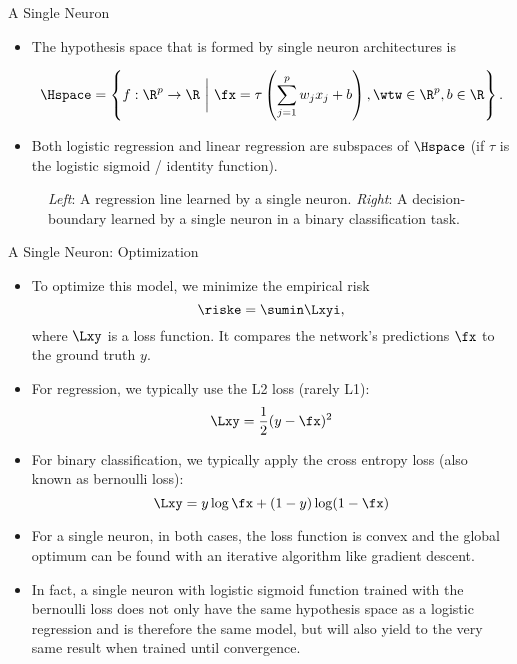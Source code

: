 \begin{vbframe}{A Single Neuron}
\begin{itemize}
\item The hypothesis space that is formed by single neuron architectures is 
\begin{small}
$$\Hspace  = \left\{f: \R^p \to \R ~\bigg|~ \fx = \tau\left(\sum_{j = 1}^p w_j x_j + b\right), \wtw \in \R^p, b \in \R\right\}.$$ 
\end{small}
\item Both logistic regression and linear regression are subspaces of $\Hspace$ (if $\tau$ is the logistic sigmoid / identity function).  \end{itemize}
\vspace*{-0.48cm}
\begin{figure}
\centering
{}
\vspace*{-0.2cm}
\begin{tiny}
\caption{\textit{Left}: A regression line learned by a single neuron. \textit{Right}: A decision-boundary learned by a single neuron in a binary classification task.}
\end{tiny}
\end{figure}
\end{vbframe}

\begin{vbframe} {A Single Neuron: Optimization}
\begin{itemize}
\item To optimize this model, we minimize the empirical risk 
$$\riske = \sumin \Lxyi,$$
where $\Lxy$ is a loss function. It compares the network's predictions $\fx$ to the ground truth $y$. 
\item For regression, we typically use the L2 loss (rarely L1): $$\Lxy = \frac{1}{2}(y - \fx)^2$$
\item For binary classification, we typically apply the cross entropy loss (also known as bernoulli loss): $$\Lxy = y \log \fx + (1 - y) \log(1 - \fx)$$
\framebreak 

\vspace{.5cm}
\item For a single neuron, in both cases, the loss function is convex and the global optimum can be found with an iterative algorithm like gradient descent. 
\vspace{1cm}
\item In fact, a single neuron with logistic sigmoid function trained with the bernoulli loss does not only have the same hypothesis space as a logistic regression and is therefore the same model, but will also yield to the very same result when trained until convergence.
\end{itemize}
\end{vbframe} 

\endlecture
